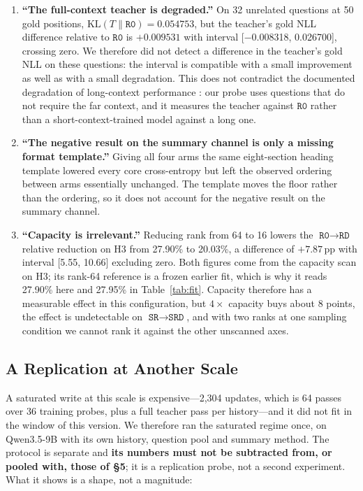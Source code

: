 \documentclass[sigconf,nonacm]{acmart}
\newcommand{\KL}{\mathrm{KL}}
\newcommand{\St}{\texttt{SR}}
\newcommand{\Sd}{\texttt{SRD}}
\newcommand{\armR}{\texttt{R0}}
\newcommand{\armRD}{\texttt{RD}}
\begin{document}
\begin{enumerate}[leftmargin=1.2em]
\item \textbf{``The full-context teacher is degraded.''} On 32 unrelated questions at 50 gold positions,
$\KL(T\|\armR)=0.054753$, but the teacher's gold NLL difference relative to $\armR$ is $+0.009531$ with
interval [$-$0.008318, 0.026700], crossing zero. We therefore did not detect a difference in the teacher's
gold NLL on these questions: the interval is compatible with a small improvement as well as with a small
degradation. This
does not contradict the documented degradation of long-context performance
\cite{still2026}: our probe uses questions that do not require the far context, and it measures the teacher
against $\armR$ rather than a short-context-trained model against a long one.
\item \textbf{``The negative result on the summary channel is only a missing format template.''} Giving
all four arms the same eight-section heading template lowered every core cross-entropy but left the observed
ordering between arms essentially unchanged. The template
moves the floor rather than the ordering, so it does not account for the negative result on the summary channel.
\item \textbf{``Capacity is irrelevant.''} Reducing rank from 64 to 16 lowers the $\armR\to\armRD$ relative
reduction on H3 from 27.90\% to 20.03\%, a difference of $+7.87$\,pp with interval [5.55, 10.66] excluding
zero. Both figures come from the capacity scan on H3; its rank-64 reference is a frozen earlier fit, which is
why it reads 27.90\% here and 27.95\% in Table~\ref{tab:fit}. Capacity therefore has a measurable effect in
this configuration, but $4\times$ capacity buys about 8 points, the effect is undetectable on
$\St\to\Sd$, and with two ranks at one sampling condition we cannot rank it against the other unscanned
axes.
\end{enumerate}

\subsection{A Replication at Another Scale}\label{sec:replication}

A saturated write at this scale is expensive---2{,}304 updates, which is 64 passes over 36 training probes, plus a
full teacher pass per history---and it did not fit in the window of this version. We therefore ran the saturated
regime once, on
Qwen3.5-9B with its own history, question pool and summary method. The protocol is separate and
\textbf{its numbers must not be subtracted from, or pooled with, those of \S5}; it is a replication probe, not a
second experiment. What it shows is a shape, not a magnitude:
\end{document}
